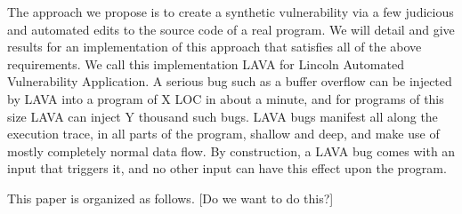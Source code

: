 The approach we propose is to create a synthetic vulnerability via a few judicious and automated edits to the source code of a real program.
We will detail and give results for an implementation of this approach that satisfies all of the above requirements.
We call this implementation LAVA for Lincoln Automated Vulnerability Application.
A serious bug such as a buffer overflow can be injected by LAVA into a program of X LOC in about a minute, and for programs of this size LAVA can inject  Y thousand such bugs.
LAVA bugs manifest all along the execution trace, in all parts of the program, shallow and deep, and make use of mostly completely normal data flow.
By construction, a LAVA bug comes with an input that triggers it, and no other input can have this effect upon the program.

This paper is organized as follows. 
[Do we want to do this?]
